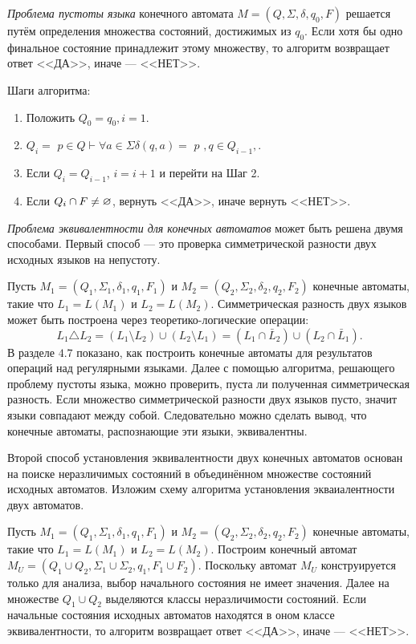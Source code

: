 \textit{Проблема пустоты языка} конечного автомата $M = (Q,\Sigma, \delta, q_0, F)$ решается путём определения множества состояний, достижимых из $q_0$. Если хотя бы одно финальное состояние принадлежит этому множеству, то алгоритм возвращает ответ <<ДА>>, иначе --- <<НЕТ>>.

Шаги алгоритма:
\begin{enumerate}
\item Положить $Q_0 = { q_0 }, i = 1$.
\item $Q_i = $ {$p \in Q \vdash \forall a \in \Sigma \delta(q, a) = $ {$ p $} $, q \in Q_{i-1},$}.
\item Если $Q_i = Q_{i-1}$, $i = i + 1$ и перейти на Шаг 2.
\item Если $Q_i \cap F \neq \varnothing$, вернуть <<ДА>>, иначе вернуть <<НЕТ>>.
\end{enumerate}

\textit{Проблема эквивалентности для конечных автоматов} может быть решена двумя способами. Первый способ --- это проверка симметрической разности двух исходных языков на непустоту.

Пусть $M_1 = (Q_1,\Sigma_1, \delta_1, q_1, F_1)$ и $M_2 = (Q_2,\Sigma_2, \delta_2, q_2, F_2)$ конечные автоматы, такие что $L_1 = L(M_1)$ и $L_2 = L(M_2)$. Симметрическая разность двух языков может быть построена через теоретико-логические операции:
\[ L_1 \triangle L_2 = (L_1 \setminus L_2) \cup(L_2 \setminus L_1) = (L_1 \cap \bar L_2) \cup (L_2 \cap \bar L_1). \]
В разделе $4.7$ показано, как построить конечные автоматы для результатов операций над регулярными языками. Далее с помощью алгоритма, решающего проблему пустоты языка, можно проверить, пуста ли полученная симметрическая разность. Если множество симметрической разности двух языков пусто, значит языки совпадают между собой. Следовательно можно сделать вывод, что конечные автоматы, распознающие эти языки, эквивалентны.

Второй способ установления эквивалентности двух конечных автоматов основан на поиске неразличимых состояний в объединённом множестве состояний исходных автоматов. Изложим схему алгоритма установления экваиалентности двух автоматов.

Пусть $M_1 = (Q_1,\Sigma_1, \delta_1, q_1, F_1)$ и $M_2 = (Q_2,\Sigma_2, \delta_2, q_2, F_2)$ конечные автоматы, такие что $L_1 = L(M_1)$ и $L_2 = L(M_2)$. Построим конечный автомат $M_U = (Q_1 \cup Q_2, \Sigma_1 \cup \Sigma_2, q_1, F_1 \cup F_2)$. Поскольку автомат $M_U$ конструируется только для анализа, выбор начального состояния не имеет значения. Далее на множестве $Q_1 \cup Q_2$ выделяются классы неразличимости состояний. Если начальные состояния исходных автоматов находятся в оном классе эквивалентности, то алгоритм возвращает ответ <<ДА>>, иначе --- <<НЕТ>>.
